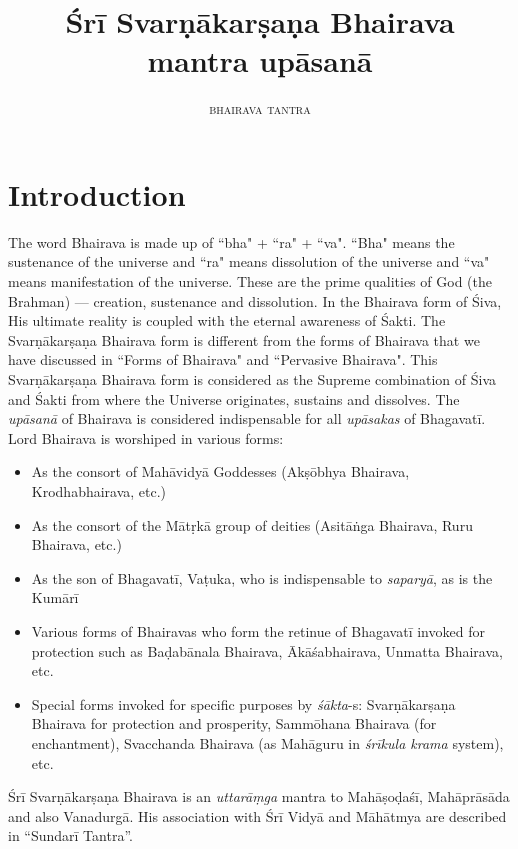 \documentclass[11pt,oneside,a4paper]{article}
\title{\textbf{Śrī Svarṇākarṣaṇa Bhairava\\ mantra upāsanā}}
\author{\textsc{bhairava tantra}}
\date{\relax}
\newcommand{\tl}[1]{\emph{#1}}
\begin{document}
\maketitle
\tableofcontents
\clearpage

{}
\section*{Introduction}

The word Bhairava is made up of ``bha" + ``ra" + ``va". ``Bha" means
the sustenance of the universe and ``ra" means dissolution of the universe
and ``va" means manifestation of the universe. These are the prime qualities
of God (the Brahman) — creation, sustenance and dissolution. In the Bhairava
form of Śiva, His ultimate reality is coupled with the eternal awareness
of Śakti. The Svarṇākarṣaṇa Bhairava form is different from the forms of
Bhairava that we have discussed in ``Forms of Bhairava" and ``Pervasive
Bhairava". This Svarṇākarṣaṇa Bhairava form is considered as the Supreme
combination of Śiva and Śakti from where the Universe originates, sustains and
dissolves. The \tl{upāsanā} of Bhairava is considered indispensable for all
\tl{upāsakas} of Bhagavatī. Lord Bhairava is worshiped in various forms:

\begin{itemize}
  \item As the consort of Mahāvidyā Goddesses (Akṣōbhya Bhairava, Krodhabhairava, etc.)
  \item As the consort of the Mātṛkā group of deities (Asitāṅga Bhairava, Ruru Bhairava, etc.)
  \item As the son of Bhagavatī, Vaṭuka, who is indispensable to \tl{saparyā}, as is the Kumārī
  \item Various forms of Bhairavas who form the retinue of Bhagavatī invoked for protection such as Baḍabānala Bhairava, Ākāśabhairava, Unmatta Bhairava, etc.
  \item Special forms invoked for specific purposes by \tl{śākta}-s: Svarṇākarṣaṇa Bhairava for protection and prosperity, Sammōhana Bhairava (for enchantment), Svacchanda Bhairava (as Mahāguru in \tl{śrīkula krama} system), etc.
\end{itemize}

Śrī Svarṇākarṣaṇa Bhairava is an \tl{uttarāṃga} mantra to Mahāṣoḍaśī,
Mahāprāsāda and also Vanadurgā. His association with Śrī Vidyā and Māhātmya
are described in ``Sundarī Tantra''.
\end{document}
